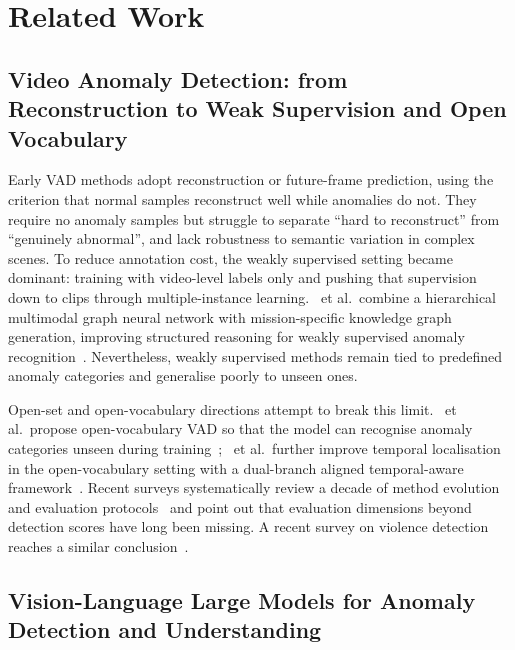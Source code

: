 \section{Related Work}
\label{sec:related}

\subsection{Video Anomaly Detection: from Reconstruction to Weak Supervision and Open Vocabulary}

Early VAD methods adopt reconstruction or future-frame prediction, using the criterion that normal samples reconstruct well while anomalies do not. They require no anomaly samples but struggle to separate ``hard to reconstruct'' from ``genuinely abnormal'', and lack robustness to semantic variation in complex scenes. To reduce annotation cost, the weakly supervised setting became dominant: training with video-level labels only and pushing that supervision down to clips through multiple-instance learning. \citeauthor{yun2025missiongnn}~et al.\ combine a hierarchical multimodal graph neural network with mission-specific knowledge graph generation, improving structured reasoning for weakly supervised anomaly recognition~\cite{yun2025missiongnn}. Nevertheless, weakly supervised methods remain tied to predefined anomaly categories and generalise poorly to unseen ones.

Open-set and open-vocabulary directions attempt to break this limit. \citeauthor{wu2024openvocab}~et al.\ propose open-vocabulary VAD so that the model can recognise anomaly categories unseen during training~\cite{wu2024openvocab}; \citeauthor{kim2026dtvad}~et al.\ further improve temporal localisation in the open-vocabulary setting with a dual-branch aligned temporal-aware framework~\cite{kim2026dtvad}. Recent surveys systematically review a decade of method evolution and evaluation protocols~\cite{abdalla2025vad10years,pravalika2026surveillance} and point out that evaluation dimensions beyond detection scores have long been missing. A recent survey on violence detection reaches a similar conclusion~\cite{houssein2026violence}.

\subsection{Vision-Language Large Models for Anomaly Detection and Understanding}

